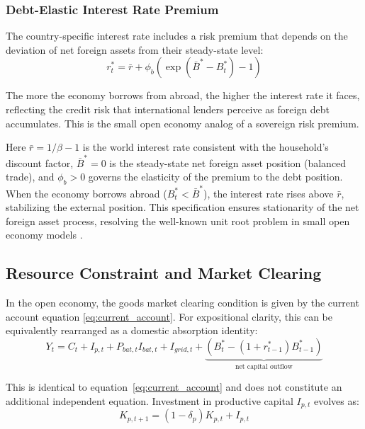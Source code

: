 \documentclass[12pt, a4paper]{article}
\begin{document}
	\subsubsection{Debt-Elastic Interest Rate Premium}
	
	The country-specific interest rate includes a risk premium that depends on the deviation of net foreign assets from their steady-state level:
	\begin{equation}
		r^*_t = \bar{r} + \phi_b \left( \exp(\bar{B}^* - B^*_t) - 1 \right)
		\label{eq:interest_premium}
	\end{equation}
	
	The more the economy borrows from abroad, the higher the interest rate it faces, reflecting the credit risk that international lenders perceive as foreign debt accumulates. This is the small open economy analog of a sovereign risk premium.
	
	Here $\bar{r} = 1/\beta - 1$ is the world interest rate consistent with the household's discount factor, $\bar{B}^* = 0$ is the steady-state net foreign asset position (balanced trade), and $\phi_b > 0$ governs the elasticity of the premium to the debt position. When the economy borrows abroad ($B^*_t < \bar{B}^*$), the interest rate rises above $\bar{r}$, stabilizing the external position. This specification ensures stationarity of the net foreign asset process, resolving the well-known unit root problem in small open economy models \citep{schmittgrohe2003}.
	
	\subsection{Resource Constraint and Market Clearing}
	
	In the open economy, the goods market clearing condition is given by the current account equation \eqref{eq:current_account}. For expositional clarity, this can be equivalently rearranged as a domestic absorption identity:
	\begin{equation}
		Y_t = C_t + I_{p,t} + P_{bat,t} I_{bat,t} + I_{grid,t} + \underbrace{(B^*_t - (1+r^*_{t-1})B^*_{t-1})}_{\text{net capital outflow}}
		\label{eq:goods_market_clearing}
	\end{equation}
	
	\noindent This is identical to equation~\eqref{eq:current_account} and does not constitute an additional independent equation. Investment in productive capital $I_{p,t}$ evolves as:
	\begin{equation}
		K_{p,t+1} = (1-\delta_p) K_{p,t} + I_{p,t}
		\label{eq:productive_capital}
	\end{equation}
	
\end{document}
